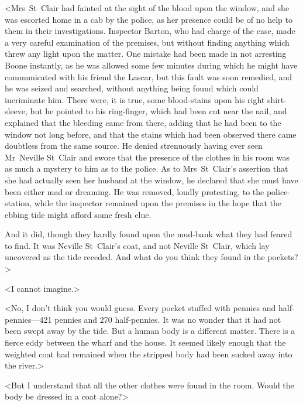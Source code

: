 <Mrs~St~Clair had fainted at the sight of the blood upon the window, and she was escorted home in a cab by the police, as her presence could be of no help to them in their investigations. Inspector Barton, who had charge of the case, made a very careful examination of the premises, but without finding anything which threw any light upon the matter. One mistake had been made in not arresting Boone instantly, as he was allowed some few minutes during which he might have communicated with his friend the Lascar, but this fault was soon remedied, and he was seized and searched, without anything being found which could incriminate him. There were, it is true, some blood-stains upon his right shirt-sleeve, but he pointed to his ring-finger, which had been cut near the nail, and explained that the bleeding came from there, adding that he had been to the window not long before, and that the stains which had been observed there came doubtless from the same source. He denied strenuously having ever seen Mr~Neville St~Clair and swore that the presence of the clothes in his room was as much a mystery to him as to the police. As to Mrs~St~Clair's assertion that she had actually seen her husband at the window, he declared that she must have been either mad or dreaming. He was removed, loudly protesting, to the police-station, while the inspector remained upon the premises in the hope that the ebbing tide might afford some fresh clue.

And it did, though they hardly found upon the mud-bank what they had feared to find. It was Neville St~Clair's coat, and not Neville St~Clair, which lay uncovered as the tide receded. And what do you think they found in the pockets?>

<I cannot imagine.>

<No, I don't think you would guess. Every pocket stuffed with pennies and half-pennies—421 pennies and 270 half-pennies. It was no wonder that it had not been swept away by the tide. But a human body is a different matter. There is a fierce eddy between the wharf and the house. It seemed likely enough that the weighted coat had remained when the stripped body had been sucked away into the river.>

<But I understand that all the other clothes were found in the room. Would the body be dressed in a coat alone?>

